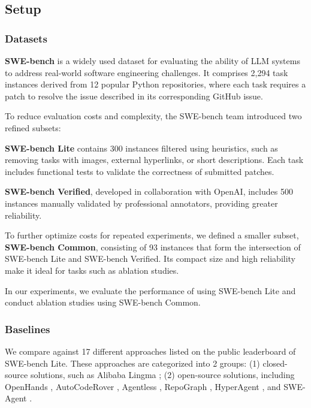 



\subsection{Setup}
\subsubsection{Datasets}

\textbf{SWE-bench} \cite{jimenez2023swe} is a widely used dataset for evaluating the ability of LLM systems to address real-world software engineering challenges. It comprises 2,294 task instances derived from 12 popular Python repositories, where each task requires a patch to resolve the issue described in its corresponding GitHub issue.

To reduce evaluation costs and complexity, the SWE-bench team introduced two refined subsets:
\squishlist
\item \textbf{SWE-bench Lite} contains 300 instances filtered using heuristics, such as removing tasks with images, external hyperlinks, or short descriptions. Each task includes functional tests to validate the correctness of submitted patches.
\item \textbf{SWE-bench Verified}, developed in collaboration with OpenAI, includes 500 instances manually validated by professional annotators, providing greater reliability.
\squishend

To further optimize costs for repeated experiments, we defined a smaller subset, \textbf{SWE-bench Common}, consisting of 93 instances that form the intersection of SWE-bench Lite and SWE-bench Verified. Its compact size and high reliability make it ideal for tasks such as ablation studies.

In our experiments, we evaluate the performance of \nickname using SWE-bench Lite and conduct ablation studies using SWE-bench Common.

\subsubsection{Baselines}



We compare \nickname against 17 different approaches listed on the public leaderboard \cite{swebenchleaderboard} of SWE-bench Lite. These approaches are categorized into 2 groups: (1) closed-source solutions, such as Alibaba Lingma \cite{repounderstander}; (2) open-source solutions, including OpenHands \cite{wang2024openhands}, AutoCodeRover \cite{zhang2024autocoderover}, Agentless \cite{xia2024agentless}, RepoGraph \cite{ouyang2024repograph}, HyperAgent \cite{phan2024hyperagent}, and SWE-Agent \cite{yang2024swe}.

